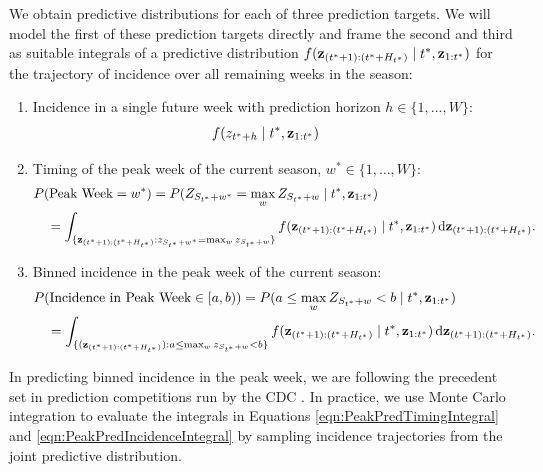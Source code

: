 \documentclass[times, doublespace]{simauth}\usepackage[]{graphicx}\usepackage[]{color}
\begin{document}
We obtain predictive distributions for each of three prediction targets.
We will model the first of these prediction targets directly and frame the
second and third as suitable integrals of a predictive
distribution $f({\bf z}_{({t^*} + 1):({t^*} + H_{t^*})} \mid {t^*}, {\bf z}_{1:{t^*}})$
for the trajectory of incidence over all remaining weeks in the season:
\begin{enumerate}
  \item Incidence in a single future week with prediction horizon $h \in \{1, ..., W\}$:
    \begin{align}
    &f(z_{{t^*} + h} \mid {t^*}, {\bf z}_{1:{t^*}}) \nonumber
    \end{align} %
  \item Timing of the peak week of the current season, $w^* \in \{1, \ldots, W\}$:
    \begin{align}
    &P(\text{Peak Week} = w^*) = P(Z_{S_{t^*} + w^*} = \max_{w} Z_{S_{t^*} + w} \mid {t^*}, {\bf z}_{1:{t^*}}) \nonumber \\
    &\quad = \int_{\{{\bf z}_{({t^*} + 1):({t^*} + H_{t^*})}: z_{S_{t^*} + w^*} = \max_{w} z_{S_{t^*} + w} \}} f({\bf z}_{({t^*} + 1):({t^*} + H_{t^*})} \mid {t^*}, {\bf z}_{1:{t^*}}) \, \mathrm{d} {\bf z}_{({t^*} + 1):({t^*} + H_{t^*})}. \label{eqn:PeakPredTimingIntegral}
    \end{align}
  \item Binned incidence in the peak week of the current season:
    \begin{align}
    &P(\text{Incidence in Peak Week} \in [a, b)) = P(a \leq \max_{w} Z_{S_{t^*} + w} < b \mid {t^*}, {\bf z}_{1:{t^*}}) \nonumber \\
    &\quad = \int_{\{({\bf z}_{({t^*} + 1):({t^*} + H_{t^*})}): a \leq \max_{w} z_{S_{t^*} + w} < b\}} f({\bf z}_{({t^*} + 1):({t^*} + H_{t^*})} \mid {t^*}, {\bf z}_{1:{t^*}}) \, \mathrm{d} {\bf z}_{({t^*} + 1):({t^*} + H_{t^*})}. \label{eqn:PeakPredIncidenceIntegral}
    \end{align}
\end{enumerate}
In predicting binned incidence in the peak week, we are following the precedent set in prediction
competitions run by the CDC \cite{PandemicPredictionandForecastingScienceandTechnologyInteragencyWorkingGroup2015Announcement,
EpidemicPredictionInitiative2015Index}.
In practice, we use Monte Carlo integration to evaluate
the integrals in Equations \eqref{eqn:PeakPredTimingIntegral} and
\eqref{eqn:PeakPredIncidenceIntegral} by sampling incidence trajectories from
the joint predictive distribution.
\end{document}
